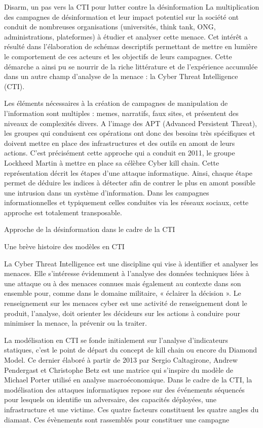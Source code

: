 


Disarm, un pas vers la CTI pour lutter contre la désinformation
La multiplication des campagnes de désinformation et leur impact potentiel sur la société ont conduit de nombreuses organisations (universités, think tank, ONG, administrations, plateformes) à étudier et analyser cette menace. Cet intérêt a résulté dans l’élaboration de schémas descriptifs permettant de mettre en lumière le comportement de ces acteurs et les objectifs de leurs campagnes. Cette démarche a ainsi pu se nourrir de la riche littérature et de l’expérience accumulée dans un autre champ d’analyse de la menace : la Cyber Threat Intelligence (CTI).

Les éléments nécessaires à la création de campagnes de manipulation de l’information sont multiples : memes, narratifs, faux sites, et présentent des niveaux de complexités divers. A l’image des APT (Advanced Persistent Threat), les groupes qui conduisent ces opérations ont donc des besoins très spécifiques et doivent mettre en place des infrastructures et des outils en amont de leurs actions. C’est précisément cette approche qui a conduit en 2011, le groupe Lockheed Martin à mettre en place sa célèbre Cyber kill chain. Cette représentation décrit les étapes d’une attaque informatique. Ainsi, chaque étape permet de déduire les indices à détecter afin de contrer le plus en amont possible une intrusion dans un système d’information. Dans les campagnes informationnelles et typiquement celles conduites via les réseaux sociaux, cette approche est totalement transposable. 

Approche  de la désinformation dans le cadre de la CTI

Une brève histoire des modèles en CTI

La Cyber Threat Intelligence est une discipline qui vise à identifier et analyser les menaces. Elle s'intéresse évidemment à l’analyse des données techniques liées à une attaque ou à des menaces connues mais également au contexte dans son ensemble pour, comme dans le domaine militaire, « éclairer la décision ». Le renseignement sur les menaces cyber est une activité de renseignement dont le produit, l’analyse, doit orienter les décideurs sur les actions à conduire pour minimiser la menace, la prévenir ou la traiter.

La modélisation en CTI se fonde initialement sur l’analyse d’indicateurs statiques, c’est le point de départ du concept de kill chain ou encore du Diamond Model. Ce dernier élaboré à partir de 2013 par Sergio Caltagirone, Andrew Pendergast et Christophe Betz est une matrice qui s’inspire du modèle de Michael Porter utilisé en analyse macroéconomique. Dans le cadre de la CTI, la modélisation des attaques informatiques repose sur des événements séquencés pour lesquels on identifie un adversaire, des capacités déployées, une infrastructure et une victime. Ces quatre facteurs constituent les quatre angles du diamant. Ces évènements sont rassemblés pour constituer une campagne 


